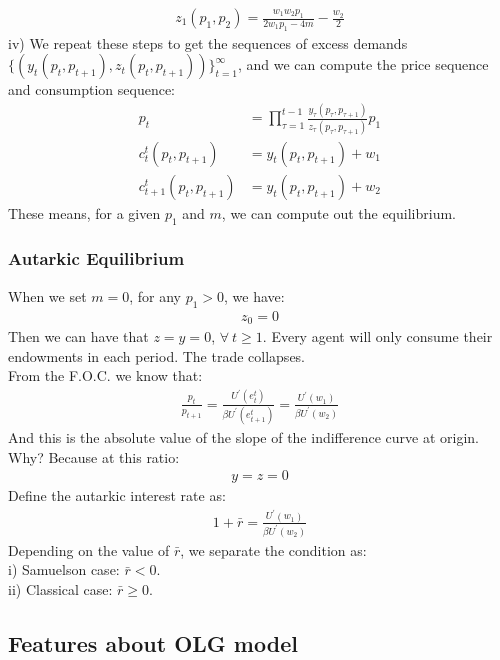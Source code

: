 \documentclass{article}
\begin{document}
	\begin{align*}
		z_1(p_1, p_2) = \frac{w_1 w_2 p_1}{2w_1 p_1 - 4m} - \frac{w_2}{2}
	\end{align*}
\indent iv) We repeat these steps to get the sequences of excess demands $\{(y_t(p_t, p_{t+1}), z_t(p_t, p_{t+1}))\}^\infty_{t=1}$, and we can compute the price sequence and consumption sequence:
	\begin{align*}
		p_t &= \prod\limits^{t-1}_{\tau=1}\frac{y_{\tau}(p_{\tau}, p_{\tau+1})}{z_{\tau}(p_{\tau}, p_{\tau+1})} p_1\\
		c^t_t(p_t, p_{t+1}) &= y_{t}(p_t, p_{t+1}) + w_1\\
		c^t_{t+1}(p_t, p_{t+1}) &= y_{t}(p_t, p_{t+1}) + w_2
	\end{align*}
These means, for a given $p_1$ and $m$, we can compute out the equilibrium.

\subsubsection{Autarkic Equilibrium}
When we set $m = 0$, for any $p_1 > 0$, we have:
	\begin{align*}
		z_0 = 0
	\end{align*}
Then we can have that $z = y =0$, $\forall\ t \geq 1$. Every agent will only consume their endowments in each period. The trade collapses.\\
From the F.O.C. we know that:
	\begin{align*}
		\frac{p_{t}}{p_{t+1}} = \frac{U^\prime(e^t_t)}{\beta U^\prime(e^t_{t+1})} = \frac{U^\prime(w_1)}{\beta U^\prime(w_2)}
	\end{align*}
And this is the absolute value of the slope of the indifference curve at origin. Why? Because at this ratio:
	\begin{align*}
		y = z =0
	\end{align*}
Define the autarkic interest rate as:
	\begin{align*}
		1 + \bar{r} = \frac{U^\prime(w_1)}{\beta U^\prime(w_2)}
	\end{align*} 
Depending on the value of $\bar{r}$, we separate the condition as:\\
\indent i) Samuelson case: $\bar{r} < 0$.\\
\indent ii) Classical case: $\bar{r} \geq 0$.


\subsection{Features about OLG model}
\end{document}
